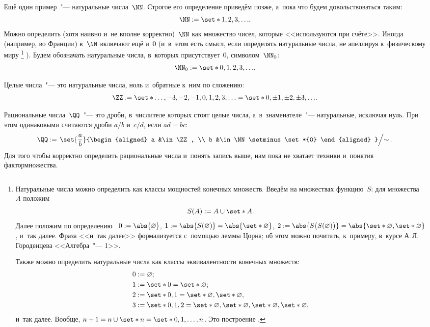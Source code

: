 \begin{example}
	Ещё один пример~"--- натуральные числа~$\NN$. Строгое его определение приведём
	позже, а~пока что будем довольствоваться таким:
	\[
		\NN := \set*{1, 2, 3, \dots}
		.
	\]
	Можно определить (хотя наивно и~не вполне корректно)~$\NN$ как множество
	чисел, которые <<используются при счёте>>.  Иногда (например, во Франции)
	в~$\NN$ включают ещё и~$0$ (и~в~этом есть смысл, если определять натуральные
	числа, не апеллируя к~физическому миру%
	\footnote{%
		Натуральные числа можно определить как классы мощностей конечных множеств.
		Введём на множествах функцию~$S$: для множества~$A$ положим
		\[
			S(A) := A \cup \set*{A}.
		\]
		Далее положим по определению~%
		$0 := \abs{\emptyset}$,
		$1 := \abs{S(\emptyset)} = \abs{\set*{\emptyset}}$,
		$2 := \abs{S \bigl( S(\emptyset) \bigr)} =
			\abs{\set*{\emptyset, \set*{\emptyset}}}$,
		и~так далее. Фраза <<и~так далее>> формализуется с~помощью леммы Цорна; об
		этом можно почитать, к~примеру, в~курсе А.\,Л.\,Городенцева <<Алгебра~"---
		1>>.

		Также можно определить натуральные числа как классы эквивалентности конечных множеств:
		\begin{align*}
			0 &:= \emptyset;
			\\
			1 &:= \set*{0} = \set*{\emptyset};
			\\
			2 &:= \set*{0, 1} = \set*{\emptyset, \set*{\emptyset}},
			\\
			3 &:= \set*{0, 1, 2} =
			\set*{\emptyset, \set*{\emptyset}, \set*{\emptyset, \set*{\emptyset}}},
		\end{align*}
		и~так далее. Вообще, $n + 1 = n \cup \set*{n} = \set*{0, 1, \dots, n}$. Это
		построение .
	}%
	). Будем обозначать натуральные числа, в~которых присутствует~$0$,
	символом~$\NN_0$:
	\[
		\NN_0 := \set*{0, 1, 2, 3, \dots}
		.
	\]
\end{example}

\begin{example}
	Целые числа~"--- это натуральные числа, ноль и~обратные к~ним по сложению:
	\[
		\ZZ := \set*{\dots, -3, -2, -1, 0, 1, 2, 3, \dots} =
		\set*{0, \pm 1, \pm 2, \pm 3, \dots}.
	\]
\end{example}

\begin{example}
	Рациональные числа~$\QQ$~"--- это дроби, в~числителе которых стоят целые
	числа, а~в~знаменателе~"--- натуральные, исключая нуль. При этом одинаковыми
	считаются дроби $a/b$ и~$c/d$, если $ad = bc$:
	\[
		\QQ :=
		\left.
			\set{\frac{a}{b}}{%
				\begin{aligned}
					a &\in \ZZ, \\
					b &\in \NN \setminus \set*{0}
				\end{aligned}
			}
		\middle/
			\sim
		\right.
		.
	\]
	Для того чтобы корректно определить рациональные числа и~понять запись выше,
	нам пока не хватает техники и~понятия фактормножества.
\end{example}

